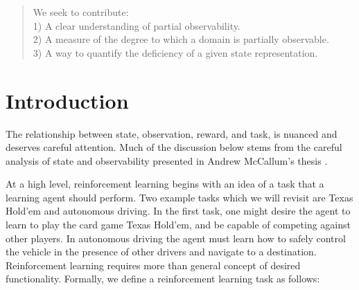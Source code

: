 \documentclass{article} %
\title{}
\author{}
\theoremstyle{definition}
\newtheorem{definition}{Definition}[section]
\begin{document}
\maketitle

\begin{abstract}
We seek to contribute:\\
1) A clear understanding of partial observability.\\
2) A measure of the degree to which a domain is partially observable.\\
3) A way to quantify the deficiency of a given state representation.\\
\end{abstract}




\section{Introduction}
The relationship between state, observation, reward, and task, is
nuanced and deserves careful attention. Much of the discussion below
stems from the careful analysis of state and observability presented
in Andrew McCallum's thesis \cite{McCallum96}.

At a high level, reinforcement learning begins with an idea of a task
that a learning agent should perform. Two example tasks which we will
revisit are Texas Hold'em and autonomous driving. In the first task,
one might desire the agent to learn to play the card game Texas
Hold'em, and be capable of competing against other players. In
autonomous driving the agent must learn how to safely control the
vehicle in the presence of other drivers and navigate to a
destination. Reinforcement learning requires more than general concept
of desired functionality. Formally, we define a reinforcement learning
task as follows:
\end{document}
